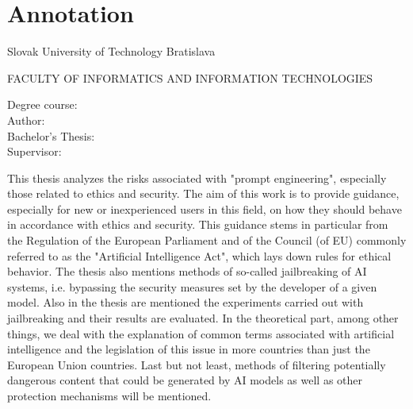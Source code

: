 \thispagestyle{empty}

\section*{Annotation}

\begin{minipage}[t]{1\columnwidth}%
Slovak University of Technology Bratislava

FACULTY OF INFORMATICS AND INFORMATION TECHNOLOGIES

Degree course: \hspace{1.4cm} \myStudyProgramEN\\

\noindent
Author: \hspace{2.6cm} \myName \\
Bachelor's Thesis: \hspace{0.75cm} \myTitleEN \\
Supervisor: \hspace{2cm} \mySupervisor \\
\noindent
\myDateEN%
\end{minipage}

\bigskip{}

This thesis analyzes the risks associated with "prompt engineering", especially those related to ethics and security. The aim of this work is to provide guidance, especially for new or inexperienced users in this field, on how they should behave in accordance with ethics and security. This guidance stems in particular from the Regulation of the European Parliament and of the Council (of EU) commonly referred to as the "Artificial Intelligence Act", which lays down rules for ethical behavior. The thesis also mentions methods of so-called jailbreaking of AI systems, i.e. bypassing the security measures set by the developer of a given model. Also in the thesis are mentioned the experiments carried out with jailbreaking and their results are evaluated. In the theoretical part, among other things, we deal with the explanation of common terms associated with artificial intelligence and the legislation of this issue in more countries than just the European Union countries. Last but not least, methods of filtering potentially dangerous content that could be generated by AI models as well as other protection mechanisms will be mentioned.

\newpage{}\thispagestyle{empty}\medskip{}


\newpage{}

\newpage
\thispagestyle{empty}
\mbox{}
\newpage
